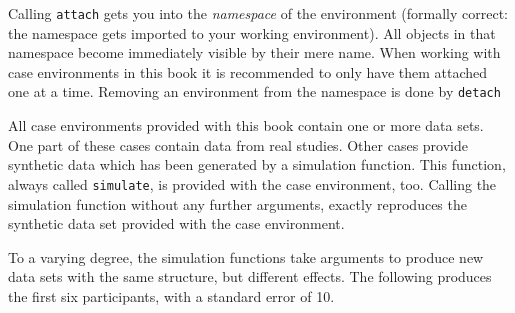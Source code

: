 \documentclass[]{svmono}
\newenvironment{Shaded}{\begin{snugshade}}{\end{snugshade}}
\newcommand{\KeywordTok}[1]{\textcolor[rgb]{0.13,0.29,0.53}{\textbf{#1}}}
\newcommand{\DataTypeTok}[1]{\textcolor[rgb]{0.13,0.29,0.53}{#1}}
\newcommand{\DecValTok}[1]{\textcolor[rgb]{0.00,0.00,0.81}{#1}}
\newcommand{\StringTok}[1]{\textcolor[rgb]{0.31,0.60,0.02}{#1}}
\newcommand{\OperatorTok}[1]{\textcolor[rgb]{0.81,0.36,0.00}{\textbf{#1}}}
\newcommand{\NormalTok}[1]{#1}
\begin{document}
\begin{Shaded}
\end{Shaded}

Calling \texttt{attach} gets you into the \emph{namespace} of the
environment (formally correct: the namespace gets imported to your
working environment). All objects in that namespace become immediately
visible by their mere name. When working with case environments in this
book it is recommended to only have them attached one at a time.
Removing an environment from the namespace is done by \texttt{detach}

All case environments provided with this book contain one or more data
sets. One part of these cases contain data from real studies. Other
cases provide synthetic data which has been generated by a simulation
function. This function, always called \texttt{simulate}, is provided
with the case environment, too. Calling the simulation function without
any further arguments, exactly reproduces the synthetic data set
provided with the case environment.

\begin{Shaded}
\end{Shaded}

To a varying degree, the simulation functions take arguments to produce
new data sets with the same structure, but different effects. The
following produces the first six participants, with a standard error of
10.

\begin{Shaded}
\end{Shaded}
\end{document}
